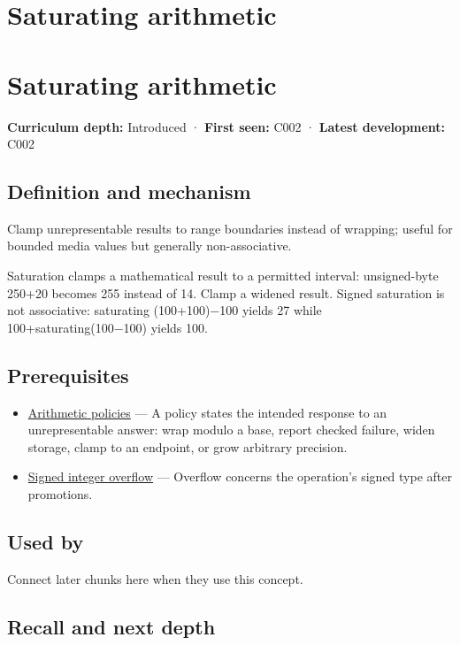 \hypertarget{appendix-3999c6209649}{}
\section*{Saturating arithmetic}
\section{Saturating arithmetic}\label{saturating-arithmetic}

\textbf{Curriculum depth:} Introduced · \textbf{First seen:} C002 · \textbf{Latest development:} C002

\subsection{Definition and mechanism}\label{definition-and-mechanism}

Clamp unrepresentable results to range boundaries instead of wrapping; useful for bounded media values but generally non-associative.

Saturation clamps a mathematical result to a permitted interval: unsigned-byte 250+20 becomes 255 instead of 14. Clamp a widened result. Signed saturation is not associative: saturating (100+100)−100 yields 27 while 100+saturating(100−100) yields 100.

\subsection{Prerequisites}\label{prerequisites}

\begin{itemize}
\tightlist
\item
  \hyperref[appendix-2ed044358b82]{Arithmetic policies} --- A policy states the intended response to an unrepresentable answer: wrap modulo a base, report checked failure, widen storage, clamp to an endpoint, or grow arbitrary precision.
\item
  \hyperref[appendix-1a599c924a4e]{Signed integer overflow} --- Overflow concerns the operation's signed type after promotions.
\end{itemize}

\subsection{Used by}\label{used-by}

Connect later chunks here when they use this concept.

\subsection{Recall and next depth}\label{recall-and-next-depth}

